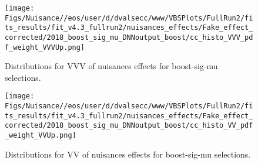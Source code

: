 


\begin{figure*}[htbp]  
\centering 
\texttt{[image: Figs/Nuisance//eos/user/d/dvalsecc/www/VBSPlots/FullRun2/fits\_results/fit\_v4.3\_fullrun2/nuisances\_effects/Fake\_effect\_corrected/2018\_boost\_sig\_mu\_DNNoutput\_boost/cc\_histo\_VVV\_pdf\_weight\_VVVUp.png]}
\\ 
\caption{ 
   Distributions for VVV of nuisances effects for boost-sig-mu selections.
} 
\label{fig:VVV_boost_sig_mu} 
\end{figure*} 




\begin{figure*}[htbp]  
\centering 
\texttt{[image: Figs/Nuisance//eos/user/d/dvalsecc/www/VBSPlots/FullRun2/fits\_results/fit\_v4.3\_fullrun2/nuisances\_effects/Fake\_effect\_corrected/2018\_boost\_sig\_mu\_DNNoutput\_boost/cc\_histo\_VV\_pdf\_weight\_VVUp.png]}
\\ 
\caption{ 
   Distributions for VV of nuisances effects for boost-sig-mu selections.
} 
\label{fig:VV_boost_sig_mu} 
\end{figure*} 


